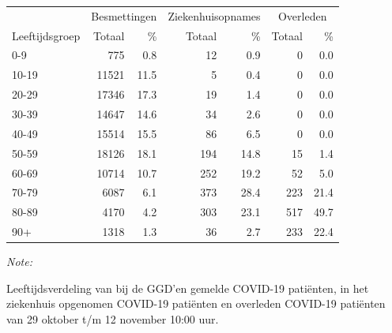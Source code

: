 \documentclass[
  english,
  man,floatsintext]{apa6}
\begin{document}
\begin{table}[H]
\centering\begingroup\fontsize{11}{13}\selectfont

\begin{threeparttable}
\begin{tabular}{lrrrrrr}
\toprule
\multicolumn{1}{c}{ } & \multicolumn{2}{c}{Besmettingen} & \multicolumn{2}{c}{Ziekenhuisopnames} & \multicolumn{2}{c}{Overleden} \\
\cmidrule(l{3pt}r{3pt}){2-3} \cmidrule(l{3pt}r{3pt}){4-5} \cmidrule(l{3pt}r{3pt}){6-7}
Leeftijdsgroep & Totaal & \% & Totaal & \% & Totaal & \%\\
\midrule
0-9 & 775 & 0.8 & 12 & 0.9 & 0 & 0.0\\
10-19 & 11521 & 11.5 & 5 & 0.4 & 0 & 0.0\\
20-29 & 17346 & 17.3 & 19 & 1.4 & 0 & 0.0\\
30-39 & 14647 & 14.6 & 34 & 2.6 & 0 & 0.0\\
40-49 & 15514 & 15.5 & 86 & 6.5 & 0 & 0.0\\
50-59 & 18126 & 18.1 & 194 & 14.8 & 15 & 1.4\\
60-69 & 10714 & 10.7 & 252 & 19.2 & 52 & 5.0\\
70-79 & 6087 & 6.1 & 373 & 28.4 & 223 & 21.4\\
80-89 & 4170 & 4.2 & 303 & 23.1 & 517 & 49.7\\
90+ & 1318 & 1.3 & 36 & 2.7 & 233 & 22.4\\
\bottomrule
\end{tabular}
\begin{tablenotes}
\item \textit{Note: } 
\item Leeftijdsverdeling van bij de GGD’en gemelde COVID-19 patiënten, in het ziekenhuis opgenomen COVID-19 patiënten en overleden COVID-19 patiënten van 29 oktober t/m 12 november 10:00 uur.
\end{tablenotes}
\end{threeparttable}
\endgroup{}
\end{table}
\end{document}
